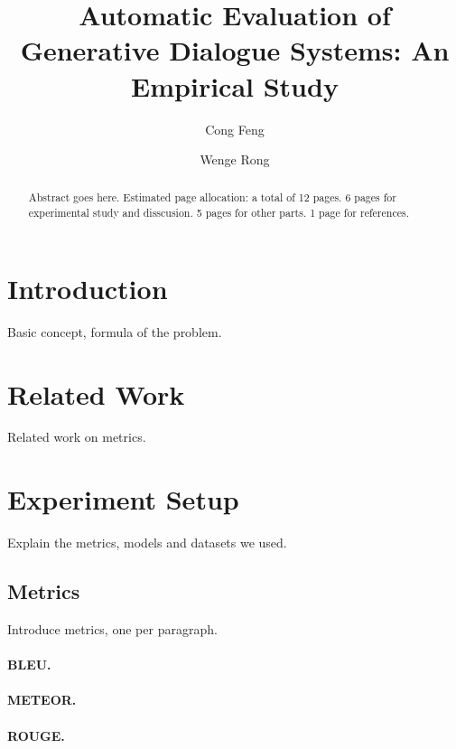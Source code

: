 \documentclass[runningheads]{llncs}
\begin{document}
\title{Automatic Evaluation of Generative Dialogue Systems: An Empirical Study}


\author{Cong Feng \and Wenge Rong}



\maketitle

\begin{abstract}
    Abstract goes here.
    Estimated page allocation: a total of 12 pages.
    6 pages for experimental study and disscusion.
    5 pages for other parts.
    1 page for references.
\end{abstract}


\section{Introduction}
Basic concept, formula of the problem.

\section{Related Work}
Related work on metrics.

\section{Experiment Setup}
Explain the metrics, models and datasets we used.

\subsection{Metrics}
Introduce metrics, one per paragraph.
\paragraph{BLEU.}
\paragraph{METEOR.}
\paragraph{ROUGE.}
\end{document}
